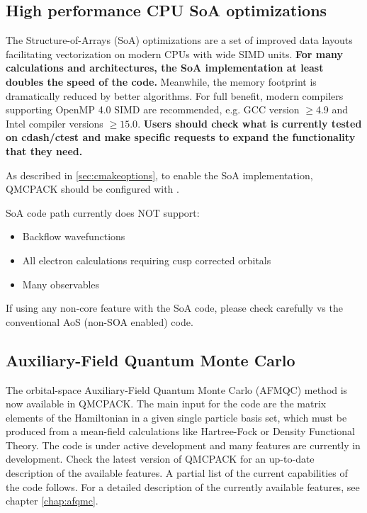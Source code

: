 \subsection{High performance CPU SoA optimizations}
The Structure-of-Arrays (SoA) optimizations \cite{IPCC_SC17} are a set
of improved data layouts facilitating vectorization on modern CPUs
with wide SIMD units. \textbf{For many calculations and architectures, the SoA
  implementation at least doubles the speed of the code.}  Meanwhile,
the memory footprint is dramatically reduced by better algorithms. For full benefit, modern
compilers supporting OpenMP 4.0 SIMD are recommended, e.g. GCC version
$\ge$4.9 and Intel compiler versions $\ge 15.0$. \textbf{Users should
  check what is currently tested on cdash/ctest and make specific
  requests to expand the functionality that they need.}

As described in \ref{sec:cmakeoptions}, to enable the SoA
implementation, QMCPACK should be configured with .

SoA code path currently does NOT support:
\begin{itemize}
  \item Backflow wavefunctions
  \item All electron calculations requiring cusp corrected orbitals
  \item Many observables
\end{itemize}

If using any non-core feature with the SoA code, please check carefully vs the conventional AoS (non-SOA enabled) code.

\subsection{Auxiliary-Field Quantum Monte Carlo}

The orbital-space Auxiliary-Field Quantum Monte Carlo (AFMQC) method is now available in QMCPACK. The main input for the code are the matrix elements of the Hamiltonian in a given single particle basis set, which must be produced from a mean-field calculations like Hartree-Fock or Density Functional Theory. The code is under active development and many features are currently in development. Check the latest version of QMCPACK for an up-to-date description of the available features. A partial list of the current capabilities of the code follows. For a detailed description of the currently available features, see chapter \ref{chap:afqmc}.
 
